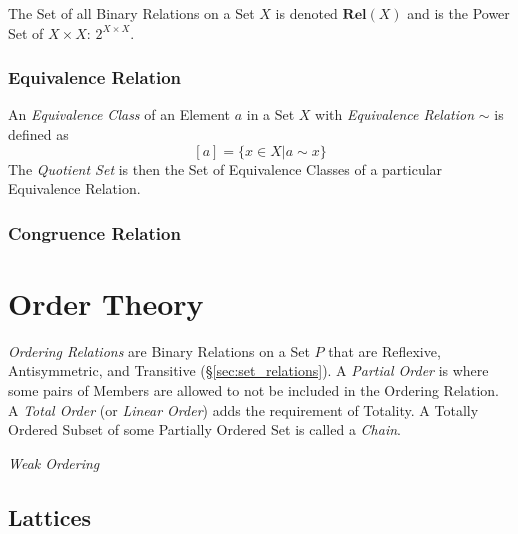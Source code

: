 \documentclass{article}
\begin{document}
The Set of all Binary Relations on a Set $X$ is denoted
$\mathbf{Rel}(X)$ and is the Power Set of $X \times X$: $2^{X \times
  X}$.

\subsubsection{Equivalence Relation}\label{subsec:equivalence_relation}

An \emph{Equivalence Class} of an Element $a$ in a Set $X$ with
\emph{Equivalence Relation} $\sim$ is defined as
\[
    [a] = \{x \in X | a \sim x\}
\]
The \emph{Quotient Set} is then the Set of Equivalence Classes of a
particular Equivalence Relation.

\subsubsection{Congruence Relation}\label{subsec:congruence_relation}

\section{Order Theory}\label{sec:order_theory}

\emph{Ordering Relations} are Binary Relations on a Set $P$ that are
Reflexive, Antisymmetric, and Transitive (\S\ref{sec:set_relations}).
A \emph{Partial Order} is where some pairs of Members are allowed to
not be included in the Ordering Relation. A \emph{Total Order} (or
\emph{Linear Order}) adds the requirement of Totality. A Totally
Ordered Subset of some Partially Ordered Set is called a \emph{Chain}.

\emph{Weak Ordering}


\subsection{Lattices}

\end{document}
